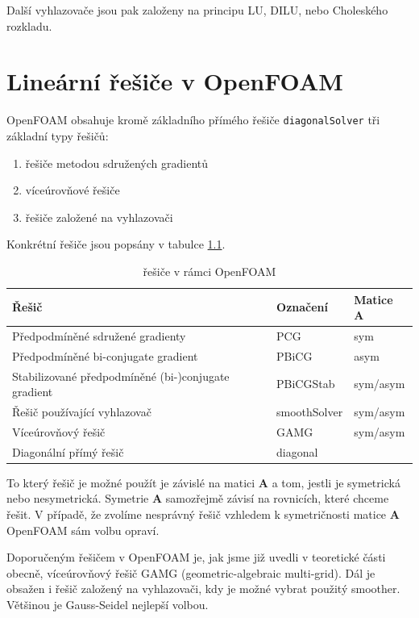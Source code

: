 \documentclass[a4paper,12pt]{report}
\theoremstyle{remark}
\begin{document}
Další vyhlazovače jsou pak založeny na principu LU, DILU, nebo Choleského rozkladu.
	
	
	{\let\clearpage\relax \chapter{Lineární řešiče v OpenFOAM}}

OpenFOAM obsahuje kromě základního přímého řešiče \texttt{diagonalSolver} tři základní typy řešičů:
\begin{enumerate}
	\item řešiče metodou sdružených gradientů 
	\item víceúrovňové řešiče
	\item řešiče založené na vyhlazovači

\end{enumerate}

Konkrétní řešiče jsou popsány v tabulce \ref{table:solvers}.

\begin{table}[H]
	\centering
	\caption{řešiče v rámci OpenFOAM}
	\renewcommand{\arraystretch}{1.7}
	\begin{tabular}{*3l}
		\toprule
		\textbf{Řešič} & \textbf{Označení}&\textbf{Matice $\boldsymbol{A}$}\\
		\midrule
		{\small Předpodmíněné sdružené gradienty}& PCG& sym\\
		{\small Předpodmíněné bi-conjugate gradient}& PBiCG&asym \\		
		{\small Stabilizované předpodmíněné (bi-)conjugate gradient}& PBiCGStab&sym/asym  \\
		{\small Řešič používající vyhlazovač}& smoothSolver&sym/asym \\
		{\small Víceúrovňový řešič}& GAMG&sym/asym  \\
		{\small Diagonální přímý řešič}& 	diagonal \\
	
		\bottomrule
	\end{tabular}
	
	\label{table:solvers}
\end{table}
		
To který řešič je možné použít je závislé na matici $\boldsymbol{A}$ a tom, jestli je symetrická nebo nesymetrická. Symetrie $\boldsymbol{A}$ samozřejmě závisí na rovnicích, které chceme řešit. V případě, že zvolíme nesprávný řešič vzhledem k symetričnosti matice $\boldsymbol{A}$ OpenFOAM sám volbu opraví.

Doporučeným řešičem v OpenFOAM je, jak jsme již uvedli v teoretické části obecně,  víceúrovňový řešič GAMG (geometric-algebraic multi-grid). Dál je obsažen i řešič založený na vyhlazovači, kdy je možné vybrat použitý smoother.  Většinou je Gauss-Seidel nejlepší volbou.
\end{document}
